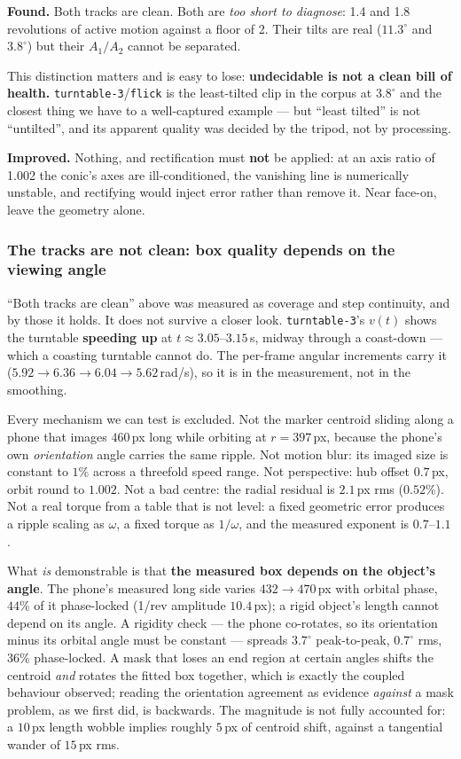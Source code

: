 \documentclass[11pt,a4paper]{article}
\newcommand{\und}{\textcolor{warn}{\textbf{undecidable}}}
\begin{document}
\textbf{Found.} Both tracks are clean. Both are \emph{too short to diagnose}: 1.4 and 1.8
revolutions of active motion against a floor of 2. Their tilts are real ($11.3^\circ$ and
$3.8^\circ$) but their $A_1/A_2$ cannot be separated.

This distinction matters and is easy to lose: \textbf{\und{} is not a clean bill of health.}
\texttt{turntable-3}/\texttt{flick} is the least-tilted clip in the corpus at $3.8^\circ$ and
the closest thing we have to a well-captured example --- but ``least tilted'' is not
``untilted'', and its apparent quality was decided by the tripod, not by processing.

\textbf{Improved.} Nothing, and rectification must \textbf{not} be applied: at an axis ratio of
1.002 the conic's axes are ill-conditioned, the vanishing line is numerically unstable, and
rectifying would inject error rather than remove it. Near face-on, leave the geometry alone.

\subsubsection{The tracks are not clean: box quality depends on the viewing angle}
\label{sec:tt3}

``Both tracks are clean'' above was measured as coverage and step continuity, and by those it holds.
It does not survive a closer look. \texttt{turntable-3}'s $v(t)$ shows the turntable
\textbf{speeding up} at $t\approx3.05$--$3.15$\,s, midway through a coast-down --- which a coasting
turntable cannot do. The per-frame angular increments carry it ($5.92 \to \mathbf{6.36} \to 6.04
\to 5.62$\,rad/s), so it is in the measurement, not in the smoothing.

Every mechanism we can test is excluded. Not the marker centroid sliding along a phone that images
$460$\,px long while orbiting at $r=397$\,px, because the phone's own \emph{orientation} angle
carries the same ripple. Not motion blur: its imaged size is constant to $1\%$ across a threefold
speed range. Not perspective: hub offset $0.7$\,px, orbit round to $1.002$. Not a bad centre: the
radial residual is $2.1$\,px rms ($0.52\%$). Not a real torque from a table that is not level: a
fixed geometric error produces a ripple scaling as $\omega$, a fixed torque as $1/\omega$, and the
measured exponent is $0.7$--$1.1$.

What \emph{is} demonstrable is that \textbf{the measured box depends on the object's angle}. The
phone's measured long side varies $432 \to 470$\,px with orbital phase, $44\%$ of it phase-locked
(1/rev amplitude $10.4$\,px); a rigid object's length cannot depend on its angle. A rigidity check
--- the phone co-rotates, so its orientation minus its orbital angle must be constant --- spreads
$3.7^\circ$ peak-to-peak, $0.7^\circ$ rms, $36\%$ phase-locked. A mask that loses an end region at
certain angles shifts the centroid \emph{and} rotates the fitted box together, which is exactly the
coupled behaviour observed; reading the orientation agreement as evidence \emph{against} a mask
problem, as we first did, is backwards. The magnitude is not fully accounted for: a $10$\,px length
wobble implies roughly $5$\,px of centroid shift, against a tangential wander of $15$\,px rms.
\end{document}
